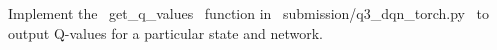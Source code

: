 \item {}
Implement the ~get_q_values~ function in ~submission/q3_dqn_torch.py~ to output Q-values for a particular state and network.
